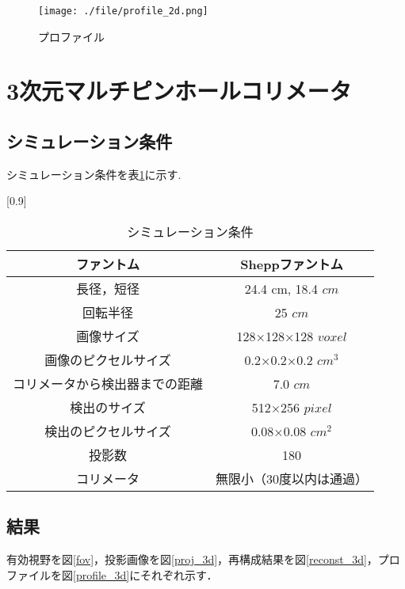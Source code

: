 \documentclass[dvipdfmx,autodetect-engine,twocolumn,10pt]{jsarticle}%
\begin{document}
\begin{figure}[htbp]
  \begin{center}
    \texttt{[image: ./file/profile\_2d.png]}\\
    \caption{プロファイル}
    \label{profile_2d}
  \end{center}
\end{figure}

\newpage


\section{3次元マルチピンホールコリメータ}

\subsection{シミュレーション条件}
シミュレーション条件を表\ref{simu_3d}に示す.

\begin{table}[htbp]
  \begin{center}
    \caption{シミュレーション条件}
    \label{simu_3d}
    \small
    \scalebox{0.82}[0.9]
    {
      \begin{tabular}{|c|c|} \hline
        ファントム & Sheppファントム \\ \hline
        長径，短径 & 24.4 cm, 18.4 $cm$ \\ \hline
        回転半径 & 25 $cm$ \\ \hline
        画像サイズ & 128×128×128 $voxel$ \\ \hline
        画像のピクセルサイズ & 0.2×0.2×0.2 $cm^3$ \\ \hline
        コリメータから検出器までの距離 & 7.0 $cm$ \\ \hline
        検出のサイズ & 512×256 $pixel$ \\ \hline
        検出のピクセルサイズ & 0.08×0.08 $cm^2$ \\ \hline
        投影数 & 180 \\ \hline
        コリメータ & 無限小（30度以内は通過） \\ \hline
      \end{tabular}
    }
  \end{center}
\end{table}

\subsection{結果}
有効視野を図\ref{fov}，投影画像を図\ref{proj_3d}，再構成結果を図\ref{reconst_3d}，プロファイルを図\ref{profile_3d}にそれぞれ示す．
\end{document}
